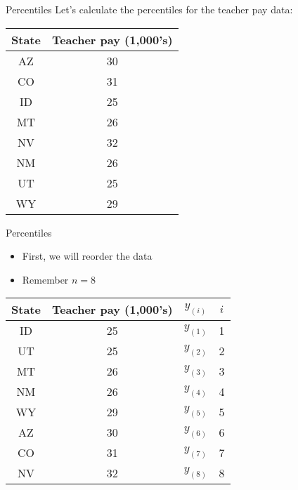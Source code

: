 \documentclass[xcolor=dvipsnames]{beamer}
\begin{document}
\begin{frame}{Percentiles}
	Let's calculate the percentiles for the teacher pay data: 
		\begin{center}
		\begin{tabular}{|c|c|}
			\hline 
			\textbf{State} & \textbf{Teacher pay (1,000's)} \\ 
			\hline \hline
			AZ & 30 \\ \hline 
			CO &  31 \\ \hline 
			ID & 25  \\  \hline 
			MT &  26 \\ \hline 
			NV & 32 \\ \hline 
			NM &  26 \\ \hline 
			UT &  25 \\ \hline 
			WY &  29 \\ \hline 
		\end{tabular} 
	\end{center}
\end{frame}

\begin{frame}{Percentiles}
\begin{itemize}
	\item First, we will reorder the data
	\item Remember $n = 8$
\end{itemize}
	\begin{center}
		\begin{tabular}{|c|c|c|c|}
			\hline 
			\textbf{State} & \textbf{Teacher pay (1,000's)} & $y_{(i)}$ & $i$ \\ 
			\hline \hline 
			ID & 25 & $y_{(1)}$& 1 \\  \hline 
			UT &  25  & $y_{(2)}$& 2\\ \hline 
			MT &  26  & $y_{(3)}$& 3\\ \hline 
			NM &  26  & $y_{(4)}$& 4\\ \hline 
			WY &  29  & $y_{(5)}$& 5\\ \hline 
			AZ & 30  & $y_{(6)}$& 6\\ \hline 
			CO &  31 & $y_{(7)}$& 7\\ \hline
			NV & 32  & $y_{(8)}$& 8\\ \hline 
		\end{tabular} 
	\end{center}
\end{frame}
\end{document}

